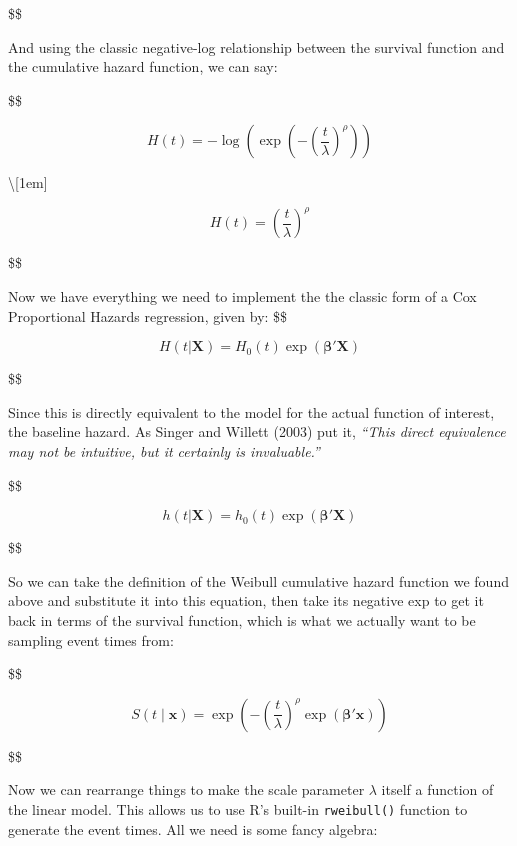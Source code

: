 \documentclass[
  letterpaper,
  DIV=11,
  numbers=noendperiod]{scrreprt}
\begin{document}
\$\$

And using the classic negative-log relationship between the survival
function and the cumulative hazard function, we can say:

\$\$

\begin{equation}
H(t) = -\log\left(\exp\left(-\left(\frac{t}{\lambda}\right)^{\rho}\right)\right)
\end{equation}

\textbackslash{[}1em{]}

\begin{equation}
H(t) = \left(\frac{t}{\lambda}\right)^{\rho}
\end{equation}

\$\$

Now we have everything we need to implement the the classic form of a
Cox Proportional Hazards regression, given by: \$\$

\begin{equation}
H(t | \mathbf{X}) = H_0(t) \exp(\mathbf{\beta}' \mathbf{X})
\end{equation}

\$\$

Since this is directly equivalent to the model for the actual function
of interest, the baseline hazard. As Singer and Willett (2003) put it,
\emph{``This direct equivalence may not be intuitive, but it certainly
is invaluable.''}

\$\$

\begin{equation}
h(t | \mathbf{X}) = h_0(t) \exp(\mathbf{\beta}' \mathbf{X})
\end{equation}

\$\$

So we can take the definition of the Weibull cumulative hazard function
we found above and substitute it into this equation, then take its
negative exp to get it back in terms of the survival function, which is
what we actually want to be sampling event times from:

\$\$

\begin{equation}
S(t \mid \mathbf{x}) = \exp\left(-\left(\frac{t}{\lambda}\right)^{\rho} \exp(\mathbf{\beta}' \mathbf{x})\right)
\end{equation}

\$\$

Now we can rearrange things to make the scale parameter \(\lambda\)
itself a function of the linear model. This allows us to use R's
built-in \texttt{rweibull()} function to generate the event times. All
we need is some fancy algebra:
\end{document}
